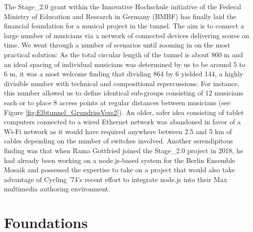 The Stage\_2.0 grant within the Innovative Hochschule initiative of the Federal Ministry of Education and Research in Germany (BMBF) has finally laid the financial foundation for a musical project in the tunnel. The aim is to connect a large number of musicians via a network of connected devices delivering scores on time. We went through a number of scenarios until zooming in on the most practical solution: As the total circular length of the tunnel is about 860 m and an ideal spacing of individual musicians was determined by us to be around 5 to 6 m, it was a most welcome finding that dividing 864 by 6 yielded 144, a highly divisible number with technical and compositional repercussions. For instance, this number allowed us to define identical sub-groups consisting of 12 musicians each or to place 8 access points at regular distances between musicians (see Figure \ref{fig:Elbtunnel_GrundrissVers2}). An older, safer idea consisting of tablet computers connected to a wired Ethernet network was abandoned in favor of a Wi-Fi network as it would have required anywhere between 2.5 and 5 km of cables depending on the number of switches involved. 
Another serendipitous finding was that when Rama Gottfried joined the Stage\_2.0 project in 2018, he had already been working on a node.js-based system for the Berlin Ensemble Mosaik and possessed the expertise to take on a project that would also take advantage of Cycling ’74’s recent effort to integrate node.js into their Max multimedia authoring environment.




\section{Foundations} \label{sec:foundations} 
%
%  
%
%



